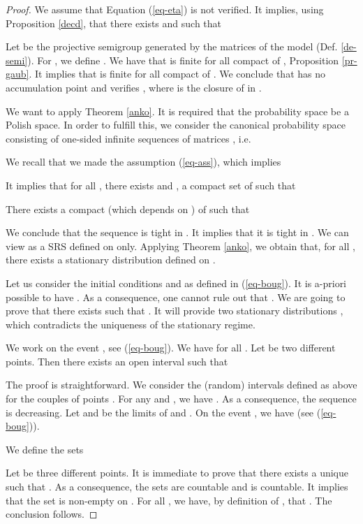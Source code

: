 \documentclass[11pt,titlepage]{article}
\def\eref#1{(\ref{#1})}
\newcommand{\parag}{\medskip\noindent}
\begin{document}
\begin{proof}
We assume that Equation \eref{eq-eta} is not verified. It implies,
using Proposition \ref{decd}, that there exists  and 
such that

Let  be the projective semigroup generated 
by the matrices of the model (Def. \ref{de-semi}).
For , we define . 
We have that  is finite for all compact 
of , Proposition \ref{pr-gaub}. 
It implies that  is finite for
all compact  of . We conclude that  has no accumulation point
and verifies , where  is the closure of 
in . 

\parag
We want to apply Theorem \ref{anko}. It is required that the probability
space be a Polish space. 
In order to fulfill this,
we consider 
the canonical probability space 
consisting of one-sided infinite sequences of matrices , 
i.e.

We recall 
that we made the assumption \eref{eq-ass}, which implies

It implies that for all , there exists  
and , a compact set of  such that

There exists a compact  (which depends on )
of  such that 

We conclude that the sequence
 is tight in . 
It implies that it is tight in . 
We can view  as
a SRS defined on  only. 
Applying Theorem \ref{anko}, we obtain that,
for all , there exists a
stationary distribution  defined on .

\parag
Let us consider the initial conditions  and  as defined in
\eref{eq-boug}. It is a-priori possible to have . As a consequence, one cannot 
rule out that . 
We are going to prove that there exists
 such that . 
It will provide
two stationary
distributions , which contradicts the 
uniqueness of the stationary regime. 

\parag


We work on the event , see \eref{eq-boug}. We have  for all . 
Let  be two different points. Then there exists an
open interval  such that


The proof is straightforward.
We consider
the (random) intervals 
 defined as above for
the couples
of points .
For any 
and , we have . As a
consequence, the sequence  
is decreasing. Let  and  be 
the limits of  and .
On
the event , we have  
(see \eref{eq-boug}).

\parag
We define the sets


Let  be three different points. It is immediate to
prove that there exists a unique  such that 
.
As a consequence, the sets  are countable and  is countable. 
It implies that 
the set
 is non-empty on .
For all , 
we have,
by definition of , that . The conclusion follows.
\end{proof}
\end{document}
